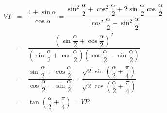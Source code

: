 \begin{bt}
{\begin{enumerate}
			\begin{eqnarray*}
				VT &=& \dfrac{1+\sin \alpha }{\cos \alpha }=\dfrac{\sin^2\dfrac{\alpha }{2}+\cos^2\dfrac{\alpha }{2}+2\sin \dfrac{\alpha }{2}\cos \dfrac{\alpha }{2}}{\cos^2\dfrac{\alpha }{2}-\sin^2\dfrac{\alpha }{2}}\\
				&=& \dfrac{\left( \sin \dfrac{\alpha }{2}+\cos \dfrac{\alpha }{2} \right)^2}{\left( \sin \dfrac{\alpha }{2}+\cos \dfrac{\alpha }{2} \right)\left( \cos \dfrac{\alpha }{2}-\sin \dfrac{\alpha }{2} \right)} \\
				&=& \dfrac{\sin \dfrac{\alpha }{2}+\cos \dfrac{\alpha }{2}}{\cos \dfrac{\alpha }{2}-\sin \dfrac{\alpha }{2}}=\dfrac{\sqrt{2}\sin \left( \dfrac{\alpha }{2}+\dfrac{\pi }{4} \right)}{\sqrt{2}\cos \left( \dfrac{\alpha }{2}+\dfrac{\pi }{4} \right)}\\
				&=& \tan \left( \dfrac{\alpha }{2}+\dfrac{\pi }{4} \right)=VP.
			\end{eqnarray*}
		\end{enumerate}
	}
\end{bt}


